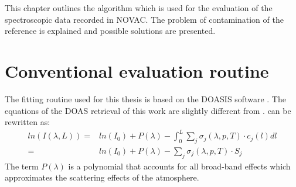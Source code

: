 

This chapter outlines the algorithm which is used for the evaluation of the spectroscopic data recorded in NOVAC. 
The problem of contamination of the reference is explained and possible solutions are presented.

\section{Conventional evaluation routine}
The fitting routine used for this thesis is based on the DOASIS software \cite{kraus2006doasis}. 
The equations of the DOAS retrieval of this work are slightly different from .
 can be rewritten as:
\begin{align}
ln\left(I\left(\lambda, L\right)\right) = &ln\left(I_0 \right) + P \left(\lambda\right) -	\int_{0}^{L}\sum_{j}\sigma_j \left(\lambda, p, T \right) \cdot c_j \left(l\right)dl \nonumber \\
= &ln\left(I_0 \right) + P \left(\lambda\right)-
\sum_{j}\sigma_j \left(\lambda, p, T \right) \cdot S_j
\label{eq:lben}
\end{align}
%
The term $ P \left(\lambda\right)$ is a polynomial that accounts for all broad-band effects which approximates the scattering effects of the atmosphere.

